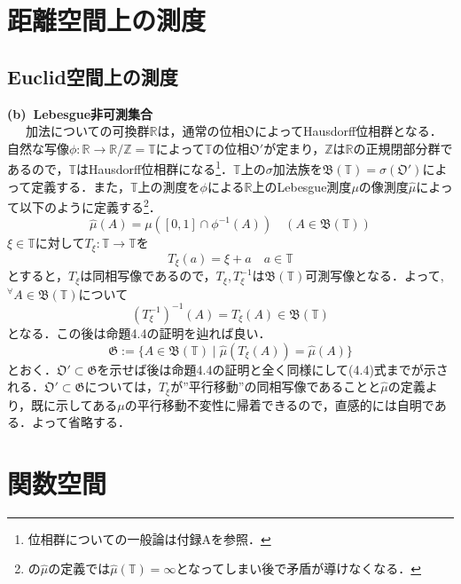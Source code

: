 \documentclass[a4paper,11pt]{jsarticle}
\begin{document}
\section{距離空間上の測度}
\subsection{Euclid空間上の測度}
{\bf (b){\ }Lebesgue非可測集合} \\
{\ }{\ }{\ }加法についての可換群$\mathbb{R}$は，通常の位相$\mathfrak{O}$によってHausdorff位相群となる．自然な写像$\phi:\mathbb{R}\rightarrow \mathbb{R}/\mathbb{Z}=\mathbb{T}$によって$\mathbb{T}$の位相$\mathfrak{O}'$が定まり，$\mathbb{Z}$は$\mathbb{R}$の正規閉部分群であるので，$\mathbb{T}$はHausdorff位相群になる\footnote{位相群についての一般論は付録Aを参照．}．$\mathbb{T}$上の$\sigma$加法族を$\mathfrak{B}(\mathbb{T})=\sigma(\mathfrak{O}')$によって定義する．また，$\mathbb{T}$上の測度を$\phi$による$\mathbb{R}$上のLebesgue測度$\mu$の像測度$\hat{\mu}$によって以下のように定義する\footnote{\cite{kotani}の$\hat{\mu}$の定義では$\hat{\mu}(\mathbb{T})=\infty$となってしまい後で矛盾が導けなくなる．}．
\begin{equation*}
\hat{\mu}(A)=\mu([0,1]\cap \phi^{-1}(A)) \quad (A\in\mathfrak{B}(\mathbb{T}))
\end{equation*}
$\xi\in\mathbb{T}$に対して$T_\xi:\mathbb{T}\rightarrow\mathbb{T}$を
\begin{equation*}
T_\xi (a)=\xi+a \quad a\in\mathbb{T}
\end{equation*}
とすると，$T_\xi$は同相写像であるので，$T_\xi,T_\xi^{-1}$は$\mathfrak{B}(\mathbb{T})$可測写像となる．よって,$^\forall A\in\mathfrak{B}(\mathbb{T})$について
\begin{equation*}
(T_\xi^{-1})^{-1}(A)=T_\xi(A)\in\mathfrak{B}(\mathbb{T})
\end{equation*}
となる．この後は命題4.4の証明を辿れば良い．
\begin{equation*}
\mathfrak{G}:=\{A\in\mathfrak{B}(\mathbb{T}) \mid \hat{\mu}(T_\xi(A))=\hat{\mu}(A)\}
\end{equation*}
とおく．$\mathfrak{O}'\subset \mathfrak{G}$を示せば後は命題4.4の証明と全く同様にして(4.4)式までが示される．$\mathfrak{O}'\subset \mathfrak{G}$については，$T_\xi$が''平行移動''の同相写像であることと$\hat{\mu}$の定義より，既に示してある$\mu$の平行移動不変性に帰着できるので，直感的には自明である．よって省略する．
%
%
%
%
\section{関数空間}
\setcounter{subsection}{1}
\end{document}
